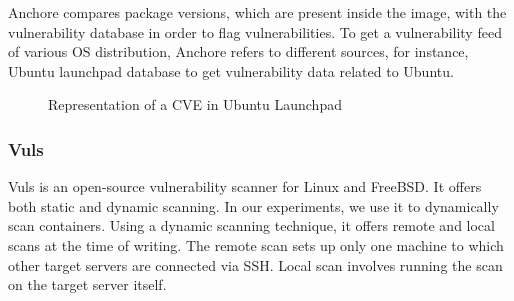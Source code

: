 \documentclass[a4paper,num-refs]{oup-contemporary}
\begin{document}
Anchore compares package versions, which are present inside the
image, with the vulnerability database in order to flag vulnerabilities.
To get a vulnerability feed of various OS distribution, Anchore refers to
different sources, for instance, Ubuntu launchpad database to get
vulnerability data related to Ubuntu.

\begin{figure}[!ht]
        \caption{\label{example} Representation of a CVE in Ubuntu Launchpad}
\end{figure}

\subsubsection{Vuls}

Vuls is an open-source vulnerability scanner for Linux and FreeBSD.
It offers both static and dynamic scanning. In our experiments, we use
it to dynamically scan containers.
Using a dynamic scanning technique, it offers
remote and local scans at the time of writing. The remote scan sets up only one machine to
which other target servers are connected via SSH. Local scan involves running
the scan on the target server itself. 
\end{document}
